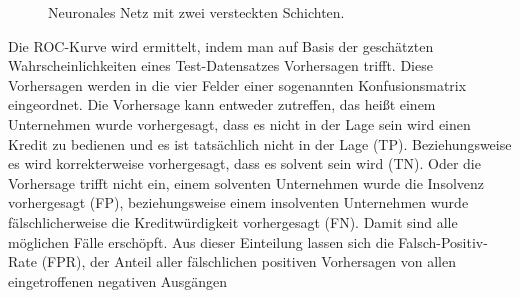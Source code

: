 \documentclass{article}
\begin{document}
\begin{figure}
\centering
\caption{Neuronales Netz mit zwei versteckten Schichten.}
\label{NN2L}
\vspace{2mm}
\end{figure}


Die ROC-Kurve wird ermittelt, indem man auf Basis der geschätzten Wahrscheinlichkeiten eines Test-Datensatzes Vorhersagen trifft. Diese Vorhersagen werden in die vier Felder einer sogenannten Konfusionsmatrix eingeordnet. Die Vorhersage kann entweder zutreffen, das heißt einem Unternehmen wurde vorhergesagt, dass es nicht in der Lage sein wird einen Kredit zu bedienen und es ist tatsächlich nicht in der Lage (TP). Beziehungsweise es wird korrekterweise vorhergesagt, dass es solvent sein wird (TN). Oder die Vorhersage trifft nicht ein, einem solventen Unternehmen wurde die Insolvenz vorhergesagt (FP), beziehungsweise einem insolventen Unternehmen wurde fälschlicherweise die Kreditwürdigkeit vorhergesagt (FN). Damit sind alle möglichen Fälle erschöpft. Aus dieser Einteilung lassen sich die Falsch-Positiv-Rate (FPR), der Anteil aller fälschlichen positiven Vorhersagen von allen eingetroffenen negativen Ausgängen
\end{document}
